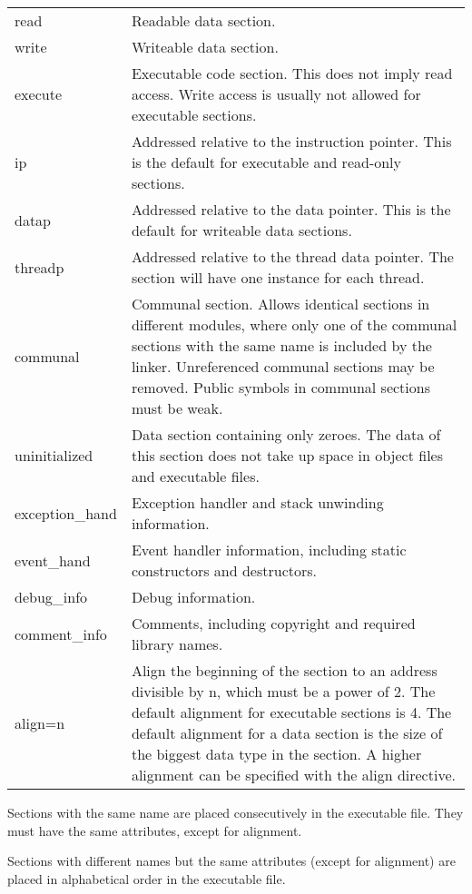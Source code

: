 \documentclass[forwardcom.tex]{subfiles}
\begin{document}
\begin{tabular}{|p{28mm}p{130mm}|}
\hline
read & Readable data section. \\
write & Writeable data section. \\
execute & Executable code section. This does not imply read access. Write access is usually not allowed for executable sections. \\
ip & Addressed relative to the instruction pointer. This is the default for executable and read-only sections. \\
datap & Addressed relative to the data pointer. This is the default for writeable data sections. \\
threadp & Addressed relative to the thread data pointer. The section will have one instance for each thread. \\
communal \label{communal} & Communal section. Allows identical sections in different modules, where only one of the
communal sections with the same name is included by the linker. 
Unreferenced communal sections may be removed.
Public symbols in communal sections must be weak. \\
uninitialized & Data section containing only zeroes. The data of this section does not take up space in object files and executable files.\\
exception\_hand & Exception handler and stack unwinding information.\\
event\_hand & Event handler information, including static constructors and destructors.\\
debug\_info & Debug information.\\
comment\_info & Comments, including copyright and required library names.\\
align=n & Align the beginning of the section to an address divisible by n, which must be a power of 2.
The default alignment for executable sections is 4. The default alignment for a data section is the size of the biggest data type in the section. A higher alignment can be specified with the align directive.\\
\hline
\end{tabular}
\vv

Sections with the same name are placed consecutively in the executable file. They must have the same attributes, except for alignment.
\vv

Sections with different names but the same attributes (except for alignment) are placed in alphabetical order in the executable file.
\vv
\end{document}
